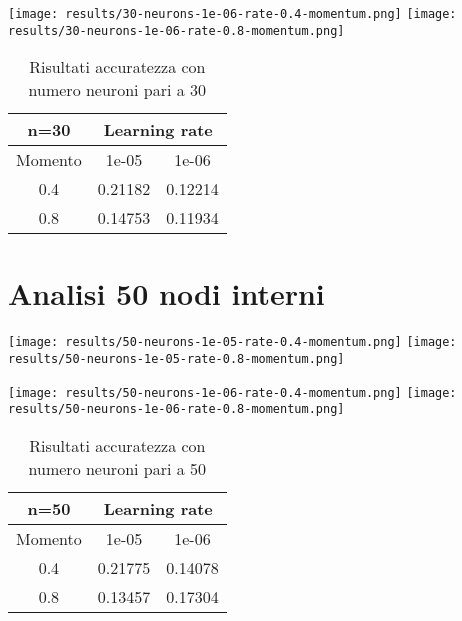 \begin{center}
\texttt{[image: results/30-neurons-1e-06-rate-0.4-momentum.png]}
\texttt{[image: results/30-neurons-1e-06-rate-0.8-momentum.png]}
\label{fig:n5-m0.8-l1e-05}
\end{center}
\begin{table}[htbp]
    \centering
    \begin{tabular}{|c|c|c|}
    \hline
    n=30 & \multicolumn{2}{c|}{Learning rate} \\
    \hline
    Momento & 1e-05 & 1e-06 \\
    \hline
    0.4 & 0.21182 & 0.12214 \\
    \hline
    0.8 & 0.14753 & 0.11934 \\
    \hline
    \end{tabular}
    \caption{Risultati accuratezza con numero neuroni pari a 30}
\end{table}

\section{Analisi 50 nodi interni}
\begin{center}
\texttt{[image: results/50-neurons-1e-05-rate-0.4-momentum.png]}
\texttt{[image: results/50-neurons-1e-05-rate-0.8-momentum.png]}
\end{center}

\begin{center}
\texttt{[image: results/50-neurons-1e-06-rate-0.4-momentum.png]}
\texttt{[image: results/50-neurons-1e-06-rate-0.8-momentum.png]}
\end{center}
\begin{table}[htbp]
    \centering
    \begin{tabular}{|c|c|c|}
    \hline
    n=50 & \multicolumn{2}{c|}{Learning rate} \\
    \hline
    Momento & 1e-05 & 1e-06 \\
    \hline
    0.4 & 0.21775 & 0.14078 \\
    \hline
    0.8 & 0.13457 & 0.17304 \\
    \hline
    \end{tabular}
    \caption{Risultati accuratezza con numero neuroni pari a 50}
\end{table}

